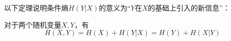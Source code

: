 以下定理说明条件熵$H(Y|X)$的意义为“$Y$在$X$的基础上引入的新信息”：
\begin{theorem}
    对于两个随机变量$X,Y$，有 
    \[
    H(X,Y) = H(X) + H(Y|X) = H(Y) + H(X|Y)
    \]
\end{theorem}

